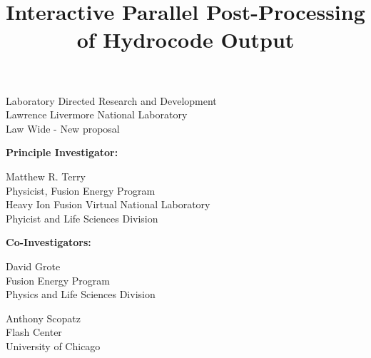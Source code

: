 \documentclass[letterpaper,11pt]{article}
\title{\color{red}Interactive Parallel Post-Processing of Hydrocode Output }
\author{}
\date{}
\begin{document}
\maketitle

\setlength{\parindent}{0pt}
\large
Laboratory Directed Research and Development \\
Lawrence Livermore National Laboratory \\
Law Wide - New proposal

\normalsize
\begin{multicols}{2}
\textbf{Principle Investigator:}
\columnbreak

Matthew R. Terry \\
Physicist, Fusion Energy Program \\
Heavy Ion Fusion Virtual National Laboratory \\
Phyicist and Life Sciences Division

\end{multicols}


\textbf{Co-Investigators:}
\begin{multicols}{2}
	David Grote \\
	Fusion Energy Program \\
	Physics and Life Sciences Division\\
	\columnbreak
			
	Anthony Scopatz \\
	Flash Center \\
	University of Chicago \\
\end{multicols}




\end{document}
